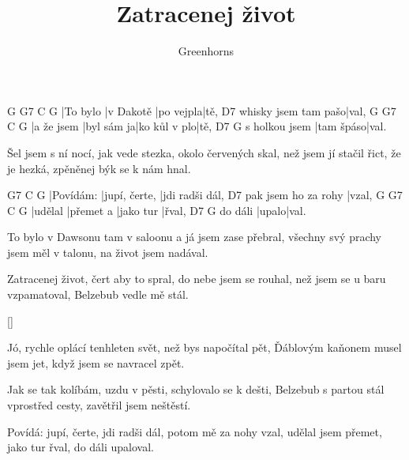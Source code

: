 \documentclass{song}
\title{Zatracenej život}
\author{Greenhorns}
\begin{document}
\begin{multicols}{2}

\strophe
G        G7        C         G
|To bylo |v Dakotě |po vejpla|tě,
                    D7
whisky jsem tam pašo|val,
G          G7         C            G
|a že jsem |byl sám ja|ko kůl v plo|tě,
              D7        G
s holkou jsem |tam špáso|val.
\endstrophe

\strophe*
Šel jsem s ní nocí, jak vede stezka,
okolo červených skal,
než jsem jí stačil řict, že je hezká,
zpěněnej býk se k nám hnal.
\endstrophe

G7        C             G
|Povídám: |jupí, čerte, |jdi radši dál,
                    D7
pak jsem ho za rohy |vzal,
G       G7        C         G
|udělal |přemet a |jako tur |řval,
        D7    G
do dáli |upalo|val.
\endstrophe

\columnbreak

\strophe*
To bylo v Dawsonu tam v saloonu
a já jsem zase přebral,
všechny svý prachy jsem měl v talonu,
na život jsem nadával.
\endstrophe

\strophe*
Zatracenej život, čert aby to spral,
do nebe jsem se rouhal,
než jsem se u baru vzpamatoval,
Belzebub vedle mě stál.
\endstrophe

\ref{}

\strophe*
Jó, rychle oplácí tenhleten svět,
než bys napočítal pět,
Ďáblovým kaňonem musel jsem jet,
když jsem se navracel zpět.
\endstrophe

\strophe*
Jak se tak kolíbám, uzdu v pěsti,
schylovalo se k dešti,
Belzebub s partou stál vprostřed cesty,
zavětřil jsem neštěstí.
\endstrophe

Povídá: jupí, čerte, jdi radši dál,
potom mě za nohy vzal,
udělal jsem přemet, jako tur řval,
do dáli upaloval.
\endstrophe

\end{multicols}
\end{document}
